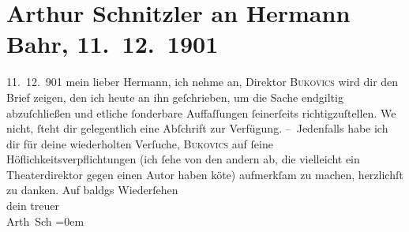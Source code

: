 

         
         \renewcommand{\erwaehntePersonen}{Personen: Hermann Bahr, Emerich von Bukovics}
         \renewcommand{\erwaehnteOrte}{Orte: Wien}
         \renewcommand{\erwaehnteWerke}{}
               \section[Arthur Schnitzler an Hermann Bahr, 11. 12. 1901]{ Arthur Schnitzler an Hermann Bahr, 11. 12. 1901}\nopagebreak{}\rehead{ }\begin{ledgroupsized}[t]{13cm}\normalsize\beginnumbering \toendnotes[C]{\smallbreak\pagebreak[2]} 
\pstart
           \raggedleft{}{\pb}11. 12. 901\pend
           \pstart{}mein lieber Hermann,\pend\pstart
           ich nehme an, Direktor \textsc{Bukovics} wird dir den Brief zeigen, den ich heute an ihn geſchrieben, um die Sache
               endgiltig abzuſchließen und etliche ſonderbare Auffaſſungen ſeinerſeits
               richtigzuſtellen. We{\geminationn} nicht, ſteht dir gelegentlich {\pb}eine Abſchrift zur
               Verfügung.\pend
           \pstart
           – Jedenfalls habe ich dir für deine wiederholten Verſuche, \textsc{Bukovics} auf ſeine Höflichkeitsverpflichtungen (ich ſehe von den andern ab, die
               vielleicht ein Theaterdirektor gegen einen Autor haben kö{\geminationn}te) aufmerkſam zu machen, herzlichſt zu danken.{\pb}\pend
           \pstart
           {\pb}Auf baldgs
               Wiederſehen{\\[\baselineskip]}dein treuer{\\[\baselineskip]}\spacefill\mbox{Arth Sch}\pend
           \leftskip=0em{}
         
         \endnumbering{}\end{ledgroupsized}  \newcommand{\dateiname}{L01189}\newcommand{\titel}{Arthur Schnitzler an Hermann Bahr, 11. 12. 1901}\newcommand{\editorInnen}{ Kurt Ifkovits,  Martin Anton Müller}
      